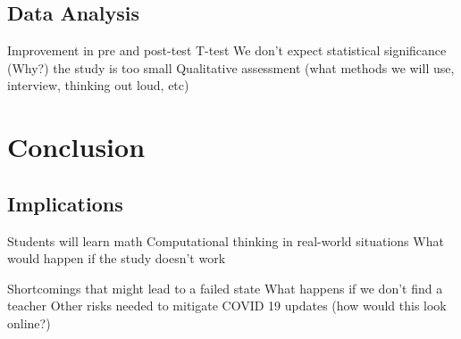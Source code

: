 \documentclass[12pt]{extarticle}
\begin{document}
\subsection*{Data Analysis}
Improvement in pre and post-test
T-test
We don’t expect statistical significance (Why?) the study is too small 
Qualitative assessment (what methods we will use, interview, thinking out loud, etc)
\section*{Conclusion}
\subsection*{Implications}
Students will learn math
Computational thinking in real-world situations
What would happen if the study doesn’t work

Shortcomings that might lead to a failed state
What happens if we don’t find a teacher
Other risks needed to mitigate
COVID 19 updates (how would this look online?)
\cite{sherin}


\end{document}

